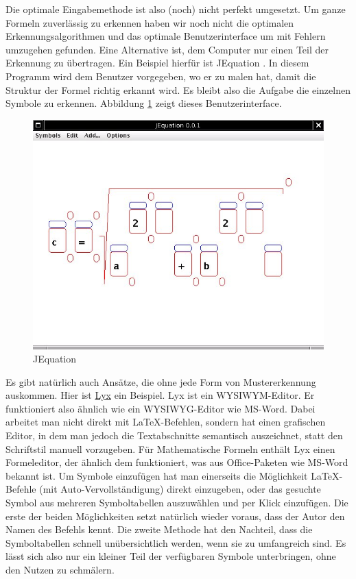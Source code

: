 Die optimale Eingabemethode ist also (noch) nicht perfekt umgesetzt. Um ganze Formeln zuverlässig zu erkennen haben wir noch nicht die optimalen Erkennungsalgorithmen und das optimale Benutzerinterface um mit Fehlern umzugehen gefunden. Eine Alternative ist, dem Computer nur einen Teil der Erkennung zu übertragen. Ein Beispiel hierfür ist JEquation \cite{jequation}. In diesem Programm wird dem Benutzer vorgegeben, wo er zu malen hat, damit die Struktur der Formel richtig erkannt wird. Es bleibt also die Aufgabe die einzelnen Symbole zu erkennen. Abbildung \ref{fig:jequation} zeigt dieses Benutzerinterface.

\begin{figure}[htbp]
  \begin{center}
    \includegraphics[width=.8\textwidth]{figures/jequation.png}
  \end{center}
  \caption{JEquation}
  \label{fig:jequation}
\end{figure}

Es gibt natürlich auch Ansätze, die ohne jede Form von Mustererkennung auskommen. Hier ist \href{http://lyx.org}{Lyx} ein Beispiel. Lyx ist ein \ac{WYSIWYM}-Editor. Er funktioniert also ähnlich wie ein \ac{WYSIWYG}-Editor wie MS-Word. Dabei arbeitet man nicht direkt mit \LaTeX-Befehlen, sondern hat einen grafischen Editor, in dem man jedoch die Textabschnitte semantisch auszeichnet, statt den Schriftstil manuell vorzugeben. Für Mathematische Formeln enthält Lyx einen Formeleditor, der ähnlich dem funktioniert, was aus Office-Paketen wie MS-Word bekannt ist. Um Symbole einzufügen hat man einerseits die Möglichkeit \LaTeX-Befehle (mit Auto-Vervollständigung) direkt einzugeben, oder das gesuchte Symbol aus mehreren Symboltabellen auszuwählen und per Klick einzufügen. Die erste der beiden Möglichkeiten setzt natürlich wieder voraus, dass der Autor den Namen des Befehls kennt. Die zweite Methode hat den Nachteil, dass die Symboltabellen schnell unübersichtlich werden, wenn sie zu umfangreich sind. Es lässt sich also nur ein kleiner Teil der verfügbaren Symbole unterbringen, ohne den Nutzen zu schmälern.

